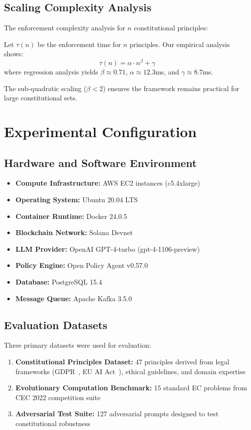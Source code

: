 \documentclass[10pt,twocolumn]{article}
\theoremstyle{definition}
\begin{document}
\subsection{Scaling Complexity Analysis}
The enforcement complexity analysis for $n$ constitutional principles:

Let $\tau(n)$ be the enforcement time for $n$ principles. Our empirical analysis shows:
$$\tau(n) = \alpha \cdot n^{\beta} + \gamma$$
where regression analysis yields $\beta \approx 0.71$, $\alpha \approx 12.3$ms, and $\gamma \approx 8.7$ms.

The sub-quadratic scaling ($\beta < 2$) ensures the framework remains practical for large constitutional sets.

\section{Experimental Configuration}
\label{sec:appendix_experimental}

\subsection{Hardware and Software Environment}
\begin{itemize}[leftmargin=*,topsep=2pt,itemsep=2pt,parsep=0pt]
    \item \textbf{Compute Infrastructure:} AWS EC2 instances (c5.4xlarge)
    \item \textbf{Operating System:} Ubuntu 20.04 LTS
    \item \textbf{Container Runtime:} Docker 24.0.5
    \item \textbf{Blockchain Network:} Solana Devnet
    \item \textbf{LLM Provider:} OpenAI GPT-4-turbo (gpt-4-1106-preview)
    \item \textbf{Policy Engine:} Open Policy Agent v0.57.0
    \item \textbf{Database:} PostgreSQL 15.4
    \item \textbf{Message Queue:} Apache Kafka 3.5.0
\end{itemize}

\subsection{Evaluation Datasets}
Three primary datasets were used for evaluation:

\begin{enumerate}
    \item \textbf{Constitutional Principles Dataset:} 47 principles derived from legal frameworks (GDPR~\cite{gdpr2016}, EU AI Act~\cite{eu2024ai}), ethical guidelines, and domain expertise
    \item \textbf{Evolutionary Computation Benchmark:} 15 standard EC problems from CEC 2022 competition suite
    \item \textbf{Adversarial Test Suite:} 127 adversarial prompts designed to test constitutional robustness
\end{enumerate}
\end{document}
